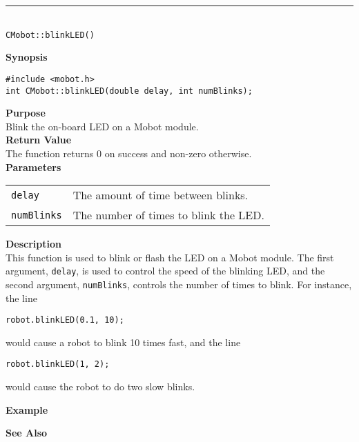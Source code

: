 \noindent
\vspace{5pt}
\rule{4.5in}{0.015in}\\
\noindent
{\LARGE \texttt{CMobot::blinkLED()}}\\
{}

\noindent
{\bf Synopsis}
\vspace{-8pt}
\begin{verbatim}
#include <mobot.h>
int CMobot::blinkLED(double delay, int numBlinks);
\end{verbatim}

\noindent
{\bf Purpose}\\
Blink the on-board LED on a Mobot module.\\

\noindent
{\bf Return Value}\\
The function returns 0 on success and non-zero otherwise.\\

\noindent
{\bf Parameters}\\
\vspace{-0.1in}
\begin{description}
\item               
\begin{tabular}{p{15 mm}p{125 mm}}
\texttt{delay} & The amount of time between blinks. \\
\texttt{numBlinks} & The number of times to blink the LED. \\
\end{tabular}
\end{description}
\noindent
{\bf Description}\\
This function is used to blink or flash the LED on a Mobot module. The first
argument, \texttt{delay}, is used to control the speed of the blinking
LED, and the second argument, \texttt{numBlinks}, controls the number of times
to blink. For instance, the line
\begin{verbatim}
robot.blinkLED(0.1, 10);
\end{verbatim}
would cause a robot to blink 10 times fast, and the line
\begin{verbatim}
robot.blinkLED(1, 2);
\end{verbatim}
would cause the robot to do two slow blinks.

\noindent
{\bf Example}\\
\noindent

\noindent
{\bf See Also}\\


